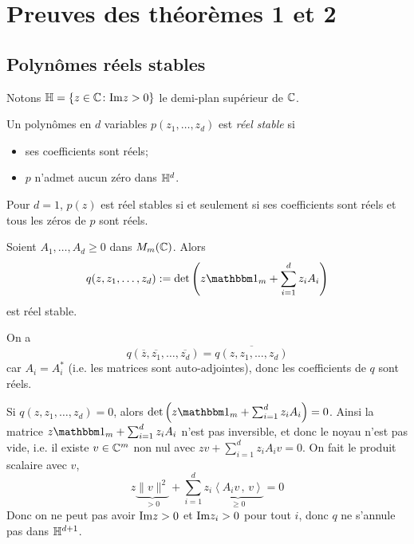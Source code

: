 
\chapter{Preuves des théorèmes 1 et 2}

\section{Polynômes réels stables}

Notons $\mathbb{H} = \{z \in \mathbb{C} \colon \mathrm{Im} z > 0\}$ le demi-plan supérieur de $\mathbb{C}$.

\begin{defi}
  Un polynômes en $d$ variables $p(z_1, \ldots, z_d)$ est \emph{réel stable} si
  \begin{itemize}
  \item ses coefficients sont réels;
  \item $p$ n'admet aucun zéro dans $\mathbb{H}^d$.
  \end{itemize}

\end{defi}

\begin{ex}
  Pour $d = 1$, $p(z)$ est réel stables si et seulement si ses coefficients sont réels et tous les zéros de
  $p$ sont réels.
\end{ex}

\begin{prop}
  \label{prop:1}
  Soient $A_1, \ldots, A_d \geq 0$ dans $M_m(\mathbb{C})$. Alors 
  \[ q(z, z_1, \ldots, z_d) := \det\left( z \un_m + \sum_{i = 1}^{d} z_i A_i \right) \]
  est réel stable.
\end{prop}

\begin{preuve}
  On a 
  \[ q(\overline{z}, \overline{z_1}, \ldots, \overline{z_d}) = \overline{q(z, z_1, \ldots, z_d)} \]
  car $A_i = A_i^\ast$ (i.e. les matrices sont auto-adjointes), donc les coefficients de $q$ sont réels.

  Si $q(z, z_1, \ldots, z_d) = 0$, alors $\det \left( z \un_m + \sum_{i = 1}^{d}z_i A_i\right) = 0$. Ainsi la
  matrice $z \un_m + \sum_{i = 1}^{d} z_i A_i$ n'est pas inversible, et donc le noyau n'est pas vide, i.e. il
  existe $v \in \mathbb{C}^m$ non nul avec $zv + \sum_{i = 1}^{d}z_i A_i v = 0$. On fait le produit scalaire avec $v$, 
  \[ z\underbrace{\|v\|^2}_{> 0} + \sum_{i = 1}^{d}z_i \underbrace{\left \langle A_i v\, ,\, v \right\rangle}_{\geq 0} = 0 \]
  Donc on ne peut pas avoir $\mathrm{Im} z > 0$ et $\mathrm{Im} z_i > 0$ pour tout $i$, donc $q$ ne s'annule pas dans $\mathbb{H}^{d
    + 1}$.
\end{preuve}

